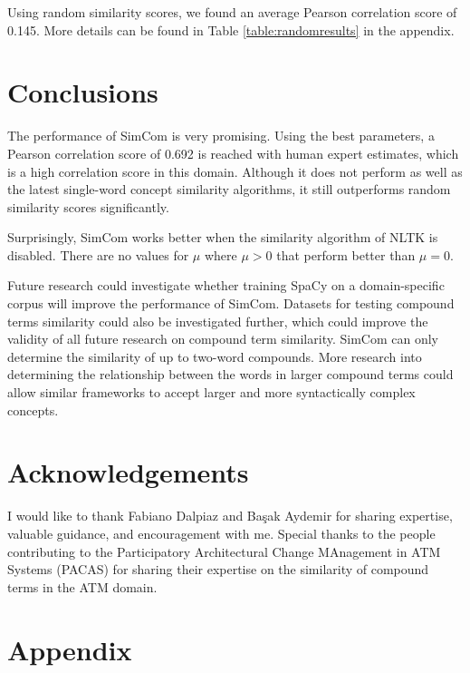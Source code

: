 \documentclass{article}
\begin{document}
Using random similarity scores, we found an average Pearson correlation score of 0.145. More details can be found in Table \ref{table:randomresults} in the appendix.

\section{Conclusions} \label{sec:conclusions}

The performance of SimCom is very promising. Using the best parameters, a Pearson correlation score of 0.692 is reached with human expert estimates, which is a high correlation score in this domain. Although it does not perform as well as the latest single-word concept similarity algorithms, it still outperforms random similarity scores significantly. 

Surprisingly, SimCom works better when the similarity algorithm of NLTK is disabled. There are no values for $\mu$ where $\mu > 0$ that perform better than $\mu = 0$.

Future research could investigate whether training SpaCy on a domain-specific corpus will improve the performance of SimCom. Datasets for testing compound terms similarity could also be investigated further, which could improve the validity of all future research on compound term similarity. SimCom can only determine the similarity of up to two-word compounds. More research into determining the relationship between the words in larger compound terms could allow similar frameworks to accept larger and more syntactically complex concepts.

\section{Acknowledgements} \label{sec:ack}

I would like to thank Fabiano Dalpiaz and Ba\c sak Aydemir for sharing expertise, valuable guidance, and encouragement with me. Special thanks to the people contributing to the Participatory Architectural Change MAnagement in ATM Systems (PACAS) for sharing their expertise on the similarity of compound terms in the ATM domain.

\printbibliography

\section{Appendix}
\end{document}
